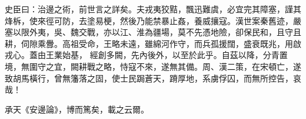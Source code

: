 \begin{pinyinscope}
 史臣曰：治邊之術，前世言之詳矣。夫戎夷狡黠，飄迅難虞，必宜完其障塞，謹其烽柝，使來徑可防，去塗易梗，然後乃能禁暴止姦，養威攘寇。漢世案秦舊迹，嚴塞以限外夷，吳、魏交戰，亦以江、淮為疆場，莫不先憑地險，卻保民和，且守且耕，伺隙乘釁。高祖受命，王略未遠，雖綿河作守，而兵孤援闊，盛衰既兆，用啟戎心。蓋由王業始基，
 經創多闕，先內後外，以至於此乎。自茲以降，分青置境，無圍守之宜，闕耕戰之略，恃寇不來，遂無其備。周、漢二策，在宋頓亡，遂致胡馬橫行，曾無籓落之固，使士民跼蒼天，蹐厚地，系虜俘囚，而無所控告，哀哉！



 承天《安邊論》，博而篤矣，載之云爾。



\end{pinyinscope}